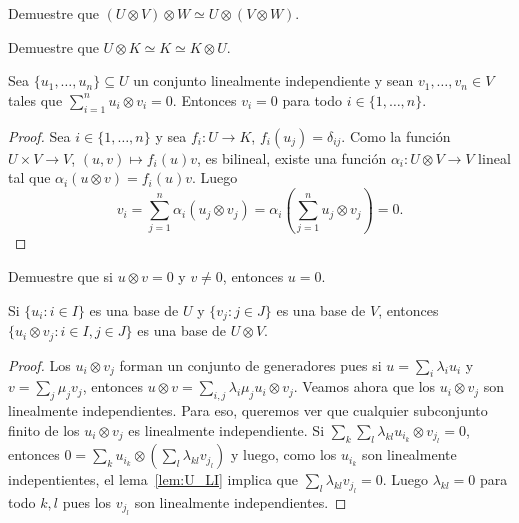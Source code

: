 \begin{exercise}
\begin{exercise}
	\label{xca:UxVxW}
	Demuestre que $(U\otimes V)\otimes W\simeq U\otimes(V\otimes W)$.
\end{exercise}

\begin{exercise}
	\label{xca:UxK}
	Demuestre que $U\otimes K\simeq K\simeq K\otimes U$.
\end{exercise}

\begin{lemma}
	\label{lem:U_LI}
	Sea $\{u_1,\dots,u_n\}\subseteq U$ un conjunto linealmente independiente y
	sean $v_1,\dots,v_n\in V$ tales que $\sum_{i=1}^n u_i\otimes v_i=0$.
	Entonces $v_i=0$ para todo $i\in\{1,\dots,n\}$.
\end{lemma}

\begin{proof}
	Sea $i\in\{1,\dots,n\}$ y sea $f_i\colon U\to K$, $f_i(u_j)=\delta_{ij}$.
	Como la función $U\times V\to V$, $(u,v)\mapsto f_i(u)v$, es bilineal, existe una función
	$\alpha_i\colon U\otimes V\to V$ lineal tal que $\alpha_i(u\otimes
	v)=f_i(u)v$. Luego
	\[
		v_i=\sum_{j=1}^n\alpha_i(u_j\otimes v_j)=\alpha_i\left(\sum_{j=1}^nu_j\otimes v_j\right)=0.
	\]
\end{proof}

\begin{exercise}
	\label{xca:uxv=0}
	Demuestre que si $u\otimes v=0$ y $v\ne 0$, entonces $u=0$.
\end{exercise}

\begin{theorem}
	Si $\{u_i:i\in I\}$ es una base de $U$ y $\{v_j:j\in J\}$ es una base de
	$V$, entonces $\{u_i\otimes v_j:i\in I,j\in J\}$ es una base de $U\otimes
	V$.
\end{theorem}

\begin{proof}
	Los $u_i\otimes v_j$ forman un conjunto de generadores pues  
	si $u=\sum_i\lambda_iu_i$ y $v=\sum_j\mu_jv_j$, entonces
	$u\otimes v=\sum_{i,j}\lambda_i\mu_ju_i\otimes v_j$. 
	Veamos ahora que los $u_i\otimes v_j$ son linealmente independientes. Para
	eso, queremos ver que cualquier subconjunto finito de los $u_i\otimes v_j$
	es linealmente independiente. Si $\sum_k\sum_l\lambda_{kl}u_{i_k}\otimes
	v_{j_l}=0$, entonces
	$0=\sum_{k}u_{i_k}\otimes\left(\sum_{l}\lambda_{kl}v_{j_l}\right)$ y luego,
	como los $u_{i_k}$ son linealmente indepentientes, el lema~\ref{lem:U_LI}
	implica que $\sum_{l}\lambda_{kl}v_{j_l}=0$. Luego $\lambda_{kl}=0$ para
	todo $k,l$ pues los $v_{j_l}$ son linealmente independientes.
\end{proof}


\end{exercise}
